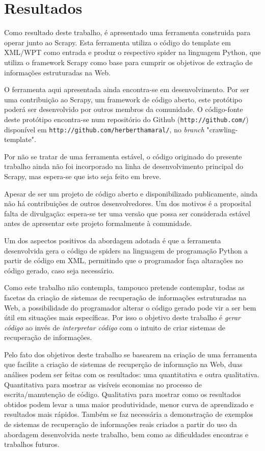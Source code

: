 \chapter{Resultados}
\thispagestyle{fancy}

Como resultado deste trabalho, é apresentado uma ferramenta construida para operar junto ao Scrapy. Esta ferramenta utiliza o código do template em XML/WPT como entrada e produz o respectivo spider na linguagem Python, que utiliza o framework Scrapy como base para cumprir os objetivos de extração de informações estruturadas na Web.

O ferramenta aqui apresentada ainda encontra-se em desenvolvimento. Por ser uma contribuição ao Scrapy, um framework de código aberto, este protótipo poderá ser desenvolvido por outros membros da comunidade. O código-fonte deste protótipo encontra-se num repositório do Github (\texttt{http://github.com/}) disponível em \texttt{http://github.com/herberthamaral/}, no \emph{branch} "crawling-template".

Por não se tratar de uma ferramenta estável, o código originado do presente trabalho ainda não foi incorporado na linha de desenvolvimento principal do Scrapy, mas espera-se que isto seja feito em breve.

Apesar de ser um projeto de código aberto e disponibilizado publicamente, ainda não há contribuições de outros desenvolvedores. Um dos motivos é a proposital falta de divulgação: espera-se ter uma versão que possa ser considerada estável antes de apresentar este projeto formalmente à comunidade.

Um dos aspectos positivos da abordagem adotada é que a ferramenta desenvolvida gera o código de spiders na linguagem de programação Python a partir de código em XML, permitindo que o programador faça altarações no código gerado, caso seja necessário. 

Como este trabalho não contempla, tampouco pretende contemplar, todas as facetas da criação de sistemas de recuperação de informações estruturadas na Web, a possibilidade do programador alterar o código gerado pode vir a ser bem útil em situações mais específicas. Por isso o objetivo deste trabalho é \emph{gerar código} ao invés de \emph{interpretar código} com o intuito de criar sistemas de recuperação de informações.

Pelo fato dos objetivos deste trabalho se basearem na criação de uma ferramenta que facilite a criação de sistemas de recuperção de informação na Web, duas análises podem ser feitas com os resultados: uma quantitativa e outra qualitativa. Quantitativa para mostrar as visíveis economias no processo de escrita/manutenção de código. Qualitativa para mostrar como os resultados obtidos podem levar a uma maior produtividade, menor curva de aprendizado e resultados mais rápidos. Também se faz necessária a demonstração de exemplos de sistemas de recuperação de informações reais criados a partir do uso da abordagem desenvolvida neste trabalho, bem como as dificuldades encontras e trabalhos futuros.

